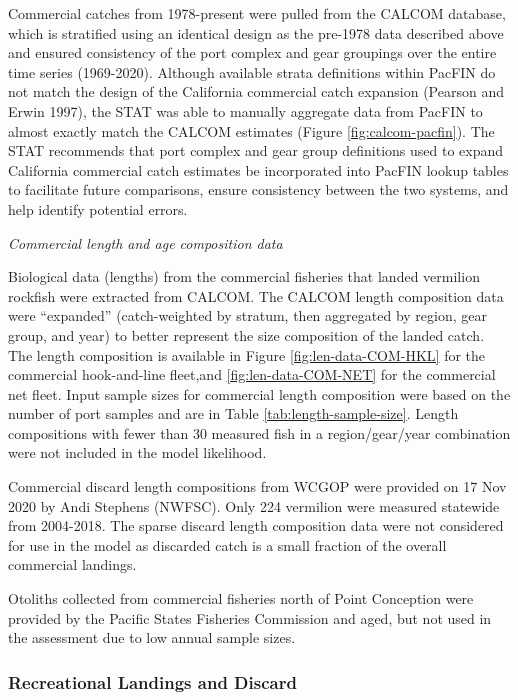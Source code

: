 \documentclass[
  english,
  a4paper,
]{article}
\begin{document}
Commercial catches from 1978-present were pulled from the CALCOM database, which is stratified using an identical design as the pre-1978 data described above and ensured consistency of the port complex and gear groupings over the entire time series (1969-2020). Although available strata definitions within PacFIN do not match the design of the California commercial catch expansion (Pearson and Erwin 1997), the STAT was able to manually aggregate data from PacFIN to almost exactly match the CALCOM estimates (Figure \ref{fig:calcom-pacfin}). The STAT recommends that port complex and gear group definitions used to expand California commercial catch estimates be incorporated into PacFIN lookup tables to facilitate future comparisons, ensure consistency between the two systems, and help identify potential errors.

\emph{Commercial length and age composition data}

Biological data (lengths) from the commercial fisheries that landed vermilion rockfish were extracted
from CALCOM. The CALCOM length composition data were ``expanded'' (catch-weighted by stratum, then aggregated by region, gear group, and year) to better represent the size composition of the landed catch. The length composition is available in Figure \ref{fig:len-data-COM-HKL}
for the commercial hook-and-line fleet,and \ref{fig:len-data-COM-NET} for the commercial net fleet.
Input sample sizes for commercial length composition were based on the number of port samples and are in Table \ref{tab:length-sample-size}. Length compositions with fewer than 30 measured fish in a region/gear/year combination were not included in the model likelihood.

Commercial discard length compositions from WCGOP were provided on
17 Nov 2020 by Andi Stephens (NWFSC). Only 224 vermilion were measured statewide from
2004-2018. The sparse discard length composition data were not considered for use in the
model as discarded catch is a small fraction of the overall commercial landings.

Otoliths collected from commercial fisheries north of Point Conception were provided by
the Pacific States Fisheries Commission and aged, but not used in the assessment due
to low annual sample sizes.

\hypertarget{recreational-landings-and-discard}{%
\subsubsection{Recreational Landings and Discard}\label{recreational-landings-and-discard}}
\end{document}
